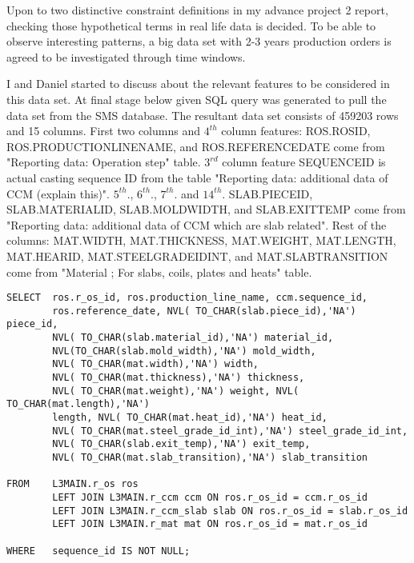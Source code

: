 \documentclass{article}
\begin{document}
Upon to two distinctive constraint definitions in my advance project 2 report, checking those hypothetical terms in real life data is decided. To be able to observe interesting patterns, a big data set with 2-3 years production orders is agreed to be investigated through time windows. 

I and Daniel started to discuss about the relevant features to be considered in this data set. At final stage below given SQL query was generated to pull the data set from the SMS database. The resultant data set consists of 459203 rows and 15 columns. First two columns and $4^{th}$ column features: ROS.R\textunderscore OS\textunderscore ID, ROS.PRODUCTION\textunderscore LINE\textunderscore NAME, and ROS.REFERENCE\textunderscore DATE come from "Reporting data: Operation step" table. $3^{rd}$ column feature SEQUENCE\textunderscore ID is actual casting sequence ID from the table "Reporting data: additional data of CCM (explain this)". $5^{th}$., $6^{th}$., $7^{th}$. and $14^{th}$. SLAB.PIECE\textunderscore ID, SLAB.MATERIAL\textunderscore ID, SLAB.MOLD\textunderscore WIDTH, and SLAB.EXIT\textunderscore TEMP come from "Reporting data: additional data of CCM which are slab related". Rest of the columns: MAT.WIDTH, MAT.THICKNESS, MAT.WEIGHT, MAT.LENGTH, MAT.HEAR\textunderscore ID, MAT.STEEL\textunderscore GRADE\textunderscore ID\textunderscore INT, and MAT.SLAB\textunderscore TRANSITION come from "Material ;  For slabs, coils, plates and heats" table.

\begin{lstlisting}
SELECT  ros.r_os_id, ros.production_line_name, ccm.sequence_id,        
        ros.reference_date, NVL( TO_CHAR(slab.piece_id),'NA') piece_id, 
        NVL( TO_CHAR(slab.material_id),'NA') material_id, 
        NVL(TO_CHAR(slab.mold_width),'NA') mold_width, 
        NVL( TO_CHAR(mat.width),'NA') width, 
        NVL( TO_CHAR(mat.thickness),'NA') thickness, 
        NVL( TO_CHAR(mat.weight),'NA') weight, NVL( TO_CHAR(mat.length),'NA')
        length, NVL( TO_CHAR(mat.heat_id),'NA') heat_id, 
        NVL( TO_CHAR(mat.steel_grade_id_int),'NA') steel_grade_id_int, 
        NVL( TO_CHAR(slab.exit_temp),'NA') exit_temp, 
        NVL( TO_CHAR(mat.slab_transition),'NA') slab_transition

FROM   	L3MAIN.r_os ros 
        LEFT JOIN L3MAIN.r_ccm ccm ON ros.r_os_id = ccm.r_os_id 
        LEFT JOIN L3MAIN.r_ccm_slab slab ON ros.r_os_id = slab.r_os_id 
        LEFT JOIN L3MAIN.r_mat mat ON ros.r_os_id = mat.r_os_id 

WHERE  	sequence_id IS NOT NULL;
\end{lstlisting}
\end{document}
